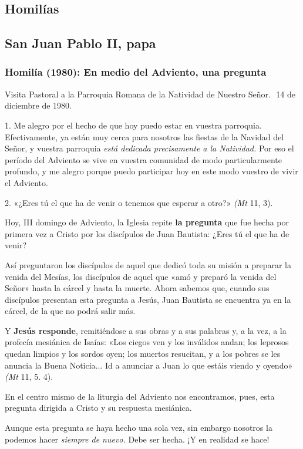 \begin{body}
\begin{body}
\section{Homilías}

\subsection{San Juan Pablo II, papa}

\subsubsection{Homilía (1980): En medio del Adviento, una pregunta}

Visita Pastoral a la Parroquia Romana de la Natividad de Nuestro Señor. 
14 de diciembre de 1980.

1. Me alegro por el hecho de que hoy puedo estar en vuestra parroquia.
Efectivamente, ya están muy cerca para nosotros las fiestas de la
Navidad del Señor, y vuestra parroquia \emph{está dedicada precisamente
	a la Natividad.} Por eso el período del Adviento se vive en vuestra
comunidad de modo particularmente profundo, y me alegro porque puedo
participar hoy en este modo vuestro de vivir el Adviento.

2. «¿Eres tú el que ha de venir o tenemos que esperar a otro?»
\emph{(Mt} 11, 3).

Hoy, III domingo de Adviento, la Iglesia repite \textbf{la pregunta} que
fue hecha por primera vez a Cristo por los discípulos de Juan Bautista:
¿Eres tú el que ha de venir?

Así preguntaron los discípulos de aquel que dedicó toda su misión a
preparar la venida del Mesías, los discípulos de aquel que «amó y
preparó la venida del Señor» hasta la cárcel y hasta la muerte. Ahora
sabemos que, cuando sus discípulos presentan esta pregunta a Jesús, Juan
Bautista se encuentra ya en la cárcel, de la que no podrá salir más.

Y \textbf{Jesús responde}, remitiéndose a sus obras y a sus palabras y,
a la vez, a la profecía mesiánica de Isaías: «Los ciegos ven y los
inválidos andan; los leprosos quedan limpios y los sordos oyen; los
muertos resucitan, y a los pobres se les anuncia la Buena Noticia... Id
a anunciar a Juan lo que estáis viendo y oyendo» \emph{(Mt} 11, 5. 4).

En el centro mismo de la liturgia del Adviento nos encontramos, pues,
esta pregunta dirigida a Cristo y su respuesta mesiánica.

Aunque esta pregunta se haya hecho una sola vez, sin embargo nosotros la
podemos hacer \emph{siempre de nuevo.} Debe ser hecha. ¡Y en realidad se
hace!


\end{body}
\end{body}
